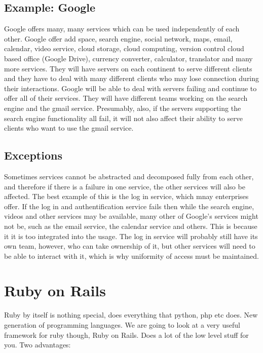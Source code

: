 \documentclass[11pt]{article}
\begin{document}
\subsection{Example: Google}

Google offers many, many services which can be used independently of each other. Google offer add space, search engine, social network, maps, email, calendar, video service, cloud storage, cloud computing, version control cloud based office (Google Drive), currency converter, calculator, translator and many more services. They will have servers on each continent to serve different clients and they have to deal with many different clients who may lose connection during their interactions. Google will be able to deal with servers failing and continue to offer all of their services. They will have different teams working on the search engine and the gmail service. Presumably, also, if the servers supporting the search engine functionality all fail, it will not also affect their ability to serve clients who want to use the gmail service.

\subsection{Exceptions}

Sometimes services cannot be abstracted and decomposed fully from each other, and therefore if there is a failure in one service, the other services will also be affected. The best example of this is the log in service, which mnay enterprises offer. If the log in and authentification service fails then while the search engine, videos and other services may be available, many other of Google's services might not be, such as the email service, the calendar service and others. This is because it it is too integrated into the usage. The log in service will probably still have its own team, however, who can take ownership of it, but other services will need to be able to interact with it, which is why uniformity of access must be maintained.


\section{Ruby on Rails}

Ruby by itself is nothing special, does everything that python, php etc does. New generation of programming languages. We are going to look at a very useful framework for ruby though, Ruby on Rails. Does a lot of the low level stuff for you. Two advantages:
 
\end{document}
